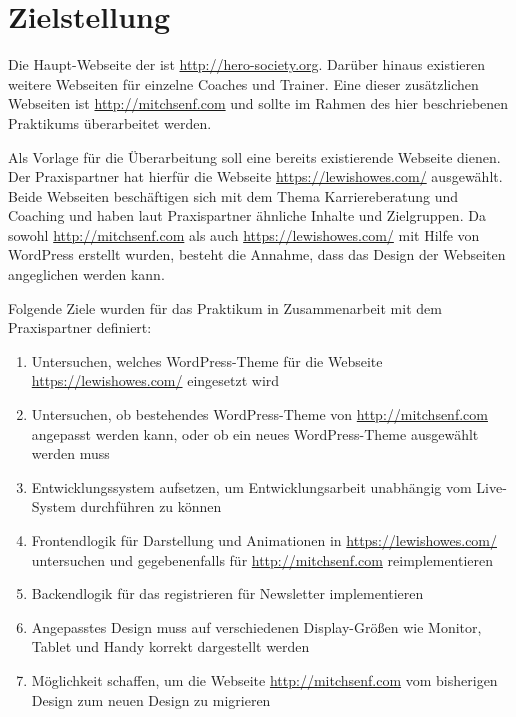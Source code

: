 
\chapter{Zielstellung}



Die Haupt-Webseite der  ist \url{http://hero-society.org}. Darüber hinaus existieren weitere Webseiten für einzelne Coaches und Trainer. Eine dieser zusätzlichen Webseiten ist \url{http://mitchsenf.com} und sollte im Rahmen des hier beschriebenen Praktikums überarbeitet werden.

Als Vorlage für die Überarbeitung soll eine bereits existierende Webseite dienen. Der Praxispartner hat hierfür die Webseite \url{https://lewishowes.com/} ausgewählt. Beide Webseiten beschäftigen sich mit dem Thema Karriereberatung und Coaching und haben laut Praxispartner ähnliche Inhalte und Zielgruppen. Da sowohl \url{http://mitchsenf.com} als auch \url{https://lewishowes.com/} mit Hilfe von WordPress erstellt wurden, besteht die Annahme, dass das Design der Webseiten angeglichen werden kann.

Folgende Ziele wurden für das Praktikum in Zusammenarbeit mit dem Praxispartner definiert:

\begin{enumerate}
	\item Untersuchen, welches WordPress-Theme für die Webseite \url{https://lewishowes.com/} eingesetzt wird
	\item Untersuchen, ob bestehendes WordPress-Theme von \url{http://mitchsenf.com} angepasst werden kann, oder ob ein neues WordPress-Theme ausgewählt werden muss
	\item Entwicklungssystem aufsetzen, um Entwicklungsarbeit unabhängig vom Live-System durchführen zu können
	\item Frontendlogik für Darstellung und Animationen in \url{https://lewishowes.com/} untersuchen und gegebenenfalls für \url{http://mitchsenf.com} reimplementieren
	\item Backendlogik für das registrieren für Newsletter implementieren
	\item Angepasstes Design muss auf verschiedenen Display-Größen wie Monitor, Tablet und Handy korrekt dargestellt werden
	\item Möglichkeit schaffen, um die Webseite \url{http://mitchsenf.com} vom bisherigen Design zum neuen Design zu migrieren
\end{enumerate}